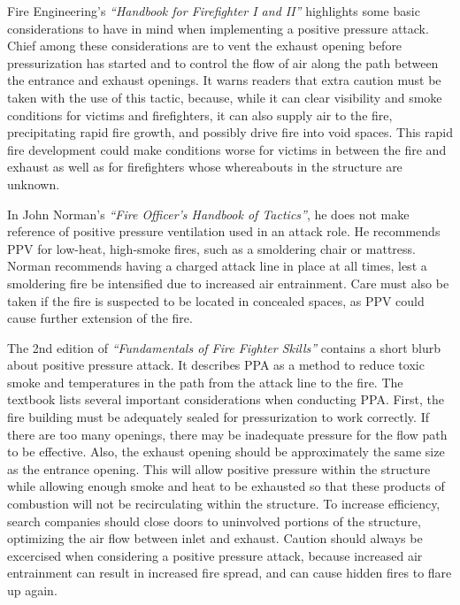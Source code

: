 \documentclass{article}
\begin{document}
Fire Engineering’s \textit{``Handbook for Firefighter I and II''} highlights some basic considerations to have in mind when implementing a positive pressure attack. Chief among these considerations are to vent the exhaust opening before pressurization has started and to control the flow of air along the path between the entrance and exhaust openings. It warns readers that extra caution must be taken with the use of this tactic, because, while it can clear visibility and smoke conditions for victims and firefighters, it can also supply air to the fire, precipitating rapid fire growth, and possibly drive fire into void spaces. This rapid fire development could make conditions worse for victims in between the fire and exhaust as well as for firefighters whose whereabouts in the structure are unknown.\cite{FE_FireI_II}

In John Norman’s \textit{``Fire Officer’s Handbook of Tactics''}, he does not make reference of positive pressure ventilation used in an attack role. He recommends PPV for low-heat, high-smoke fires, such as a smoldering chair or mattress. Norman recommends having a charged attack line in place at all times, lest a smoldering fire be intensified due to increased air entrainment. Care must also be taken if the fire is suspected to be located in concealed spaces, as PPV could cause further extension of the fire.\cite{NormanHandbook}

The 2nd edition of \textit{``Fundamentals of Fire Fighter Skills''} contains a short blurb about positive pressure attack. It describes PPA as a method to reduce toxic smoke and temperatures in the path from the attack line to the fire. The textbook lists several important considerations when conducting PPA. First, the fire building must be adequately sealed for pressurization to work correctly. If there are too many openings, there may be inadequate pressure for the flow path to be effective. Also, the exhaust opening should be approximately the same size as the entrance opening. This will allow positive pressure within the structure while allowing enough smoke and heat to be exhausted so that these products of combustion will not be recirculating within the structure. To increase efficiency, search companies should close doors to uninvolved portions of the structure, optimizing the air flow between inlet and exhaust. Caution should always be excercised when considering a positive pressure attack, because increased air entrainment can result in increased fire spread, and can cause hidden fires to flare up again.\cite{NFPA_IAFC}
\end{document}
